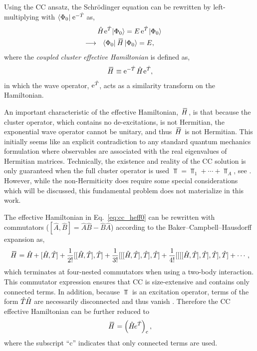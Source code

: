 \documentclass[thesis.tex]{subfiles}
\begin{document}
Using the CC ansatz, the Schr\"odinger equation can be rewritten by left-multiplying with $\langle \Phi_{0} |\hspace{1pt} \operatorname{e}^{-\hat{T}\hspace{-0.25pt}}$ as,
\begin{gather} \label{eq:cc_schrodeq}
  \Ham \E^{\Top} \refket = E \E^{\Top} \refket \notag \\
  \hspace{-1.0cm}\longrightarrow \ \ \refbra\EHam\refket = E,
\end{gather}
where the \textit{coupled cluster effective Hamiltonian} is defined as,
\begin{align} \label{eq:cc_heff0}
  \EHam \equiv \E^{-\Top} \Ham \E^{\Top},
\end{align}
in which the wave operator, $\operatorname{e}^{\hat{T}\hspace{-0.25pt}}$, acts as a similarity transform on the Hamiltonian.

An important characteristic of the effective Hamiltonian, $\EHam$, is that because the cluster operator, which contains no de-excitations, is not Hermitian, the exponential wave operator cannot be unitary, and thus $\EHam$ is not Hermitian.  This initially seems like an explicit contradiction to any standard quantum mechanics formulation where observables are associated with the real eigenvalues of Hermitian matrices. Technically, the existence and reality of the CC solution is only guaranteed when the full cluster operator is used $\Top = \Top_{1} + \cdots + \Top_{A}$, see \cite{ZIVKOVIC1977,MOISEYEV2011}.  However, while the non-Hermiticity does require some special considerations which will be discussed, this fundamental problem does not materialize in this work.

The effective Hamiltonian in Eq.\ \eqref{eq:cc_heff0} can be rewritten with commutators ($[ \hat{A},\hat{B} ] = \hat{A}\hat{B} - \hat{B}\hat{A}$) according to the Baker--Campbell--Hausdorff expansion as,
\begin{align*}
  \EHam = \Ham + [\Ham, \Top] + \frac{1}{2!} [[\Ham, \Top], \Top] + \frac{1}{3!} [[[\Ham, \Top], \Top], \Top] + \frac{1}{4!} [[[[\Ham, \Top], \Top], \Top], \Top] + \cdots,
\end{align*}
which terminates at four-nested commutators when using a two-body  interaction.  This commutator expression ensures that CC is size-extensive and contains only connected terms.  In addition, because $\Top$ is an excitation operator, terms of the form $\hat{T}\hspace{-0.25pt}\hat{H}\hspace{-1pt}$ are necessarily disconnected and thus vanish \cite{SHAVITT2009}.  Therefore the CC effective Hamiltonian can be further reduced to
\begin{align} \label{eq:cc_heff1}
  \EHam = \left(\Ham e^{\Top}\right)_{\mathrm{c}},
\end{align}
where the subscript ``$\mathrm{c}$'' indicates that only connected terms are used.
\end{document}
